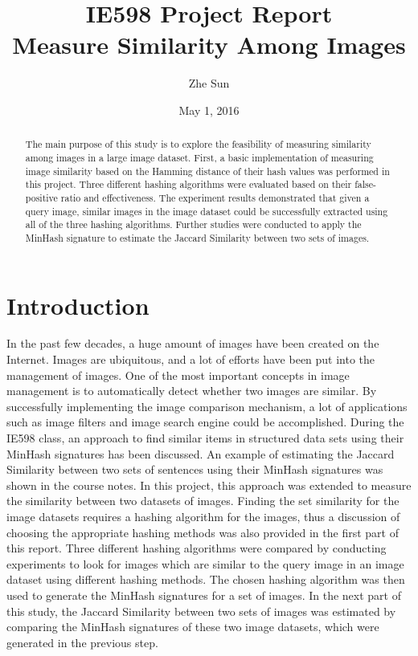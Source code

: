 \documentclass[letterpaper,12pt]{article}
\begin{document}
\title{IE598 Project Report \\ Measure Similarity Among Images}
\author{Zhe Sun}
\date{May 1, 2016}
\maketitle

\begin{abstract}

The main purpose of this study is to explore the feasibility of measuring similarity among images in a large image dataset. First, a basic implementation of measuring image similarity based on the Hamming distance of their hash values was performed in this project. Three different hashing algorithms were evaluated based on their false-positive ratio and effectiveness. The experiment results demonstrated that given a query image, similar images in the image dataset could be successfully extracted using all of the three hashing algorithms. Further studies were conducted to apply the MinHash signature to estimate the Jaccard Similarity between two sets of images.

\end{abstract}


\section{Introduction}

In the past few decades, a huge amount of images have been created on the Internet. Images are ubiquitous, and a lot of efforts have been put into the management of images. One of the most important concepts in image management is to automatically detect whether two images are similar. By successfully implementing the image comparison mechanism, a lot of applications such as image filters and image search engine could be accomplished. During the IE598 class, an approach to find similar items in structured data sets using their MinHash signatures has been discussed. An example of estimating the Jaccard Similarity between two sets of sentences using their MinHash signatures was shown in the course notes. In this project, this approach was extended to measure the similarity between two datasets of images. Finding the set similarity for the image datasets requires a hashing algorithm for the images, thus a discussion of choosing the appropriate hashing methods was also provided in the first part of this report. Three different hashing algorithms were compared by conducting experiments to look for images which are similar to the query image in an image dataset using different hashing methods. The chosen hashing algorithm was then used to generate the MinHash signatures for a set of images. In the next part of this study, the Jaccard Similarity between two sets of images was estimated by comparing the MinHash signatures of these two image datasets, which were generated in the previous step. 
 
\end{document}
